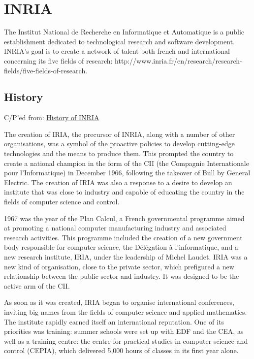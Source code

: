 \newpage
\section{INRIA}

The Institut National de Recherche en Informatique et Automatique is a public establishment dedicated to technological research and software development. INRIA's goal is to create a network of talent both french and international concerning its five fields of research: http://www.inria.fr/en/research/research-fields/five-fields-of-research. 

\subsection{History}

C/P'ed from: \href{http://www.inria.fr/en/institute/inria-in-brief/history-of-inria}{History of INRIA}

The creation of IRIA, the precursor of INRIA, along with a number of other organisations, was a symbol of the proactive policies to develop cutting-edge technologies and the means to produce them. This prompted the country to create a national champion in the form of the CII (the Compagnie Internationale pour l'Informatique) in December 1966, following the takeover of Bull by General Electric. The creation of IRIA was also a response to a desire to develop an institute that was close to industry and capable of educating the country in the fields of computer science and control.


1967 was the year of the Plan Calcul, a French governmental programme aimed at promoting a national computer manufacturing industry and associated research activities. This programme included the creation of a new government body responsible for computer science, the Délégation à l'informatique, and a new research institute, IRIA, under the leadership of Michel Laudet. IRIA was a new kind of organisation, close to the private sector, which prefigured a new relationship between the public sector and industry. It was designed to be the active arm of the CII.


As soon as it was created, IRIA began to organise international conferences, inviting big names from the fields of computer science and applied mathematics. The institute rapidly earned itself an international reputation. One of its priorities was training: summer schools were set up with EDF and the CEA, as well as a training centre: the centre for practical studies in computer science and control (CEPIA), which delivered 5,000 hours of classes in its first year alone.


